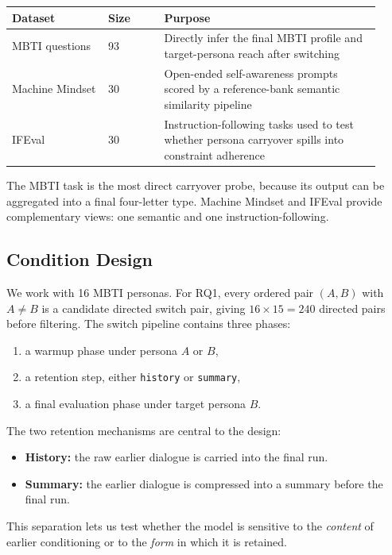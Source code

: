 \documentclass[11pt]{article}
\begin{document}
\begin{center}
\small
\begin{tabular}{@{}p{0.24\linewidth} p{0.14\linewidth} p{0.54\linewidth}@{}}
\toprule
\textbf{Dataset} & \textbf{Size} & \textbf{Purpose} \\
\midrule
MBTI questions & 93 & Directly infer the final MBTI profile and target-persona reach after switching \\
Machine Mindset & 30 & Open-ended self-awareness prompts scored by a reference-bank semantic similarity pipeline \\
IFEval & 30 & Instruction-following tasks used to test whether persona carryover spills into constraint adherence \\
\bottomrule
\end{tabular}
\end{center}

The MBTI task is the most direct carryover probe, because its output can be aggregated into a final four-letter type.
Machine Mindset and IFEval provide complementary views: one semantic and one instruction-following.

\subsection{Condition Design}

We work with 16 MBTI personas.
For RQ1, every ordered pair $(A,B)$ with $A \neq B$ is a candidate directed switch pair, giving $16 \times 15 = 240$ directed pairs before filtering.
The switch pipeline contains three phases:
\begin{enumerate}[leftmargin=*]
    \item a warmup phase under persona $A$ or $B$,
    \item a retention step, either \texttt{history} or \texttt{summary},
    \item a final evaluation phase under target persona $B$.
\end{enumerate}

The two retention mechanisms are central to the design:
\begin{itemize}[leftmargin=*]
    \item \textbf{History:} the raw earlier dialogue is carried into the final run.
    \item \textbf{Summary:} the earlier dialogue is compressed into a summary before the final run.
\end{itemize}

This separation lets us test whether the model is sensitive to the \emph{content} of earlier conditioning or to the \emph{form} in which it is retained.
\end{document}
